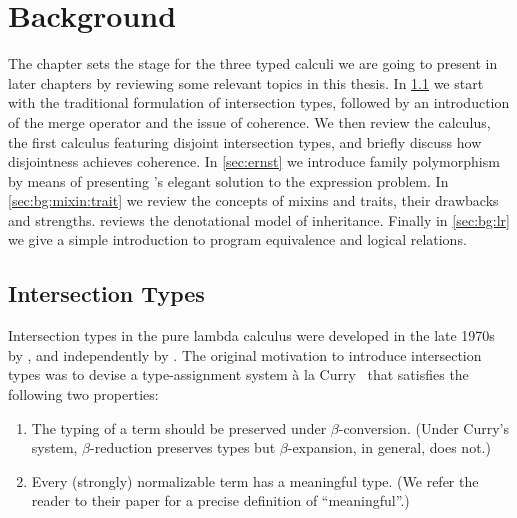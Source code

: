 
\chapter{Background}
\label{chap:background}

The chapter sets the stage for the three typed calculi we are going to
present in later chapters by reviewing some relevant topics in this thesis. In
\cref{bg:sec:intersection} we start with the traditional formulation of
intersection types, followed by an introduction of the merge operator and the
issue of coherence. We then review the \oname calculus, the first calculus
featuring disjoint intersection types, and briefly discuss how disjointness
achieves coherence. In \cref{sec:ernst} we introduce family polymorphism by
means of presenting \citeauthor{ernst2004expression}'s elegant solution to the
expression problem. In \cref{sec:bg:mixin:trait} we review the concepts of
mixins and traits, their drawbacks and strengths.  reviews
the denotational model of inheritance. Finally in \cref{sec:bg:lr} we give a
simple introduction to program equivalence and logical relations.




\section{Intersection Types}
\label{bg:sec:intersection}


Intersection types in the pure lambda calculus were developed in the late
1970s by \citet{coppoInter}, and independently by \citet{pottinger1980type}. The
original motivation to introduce intersection types was to devise a
type-assignment system \`a la Curry~\citep{CurryFeys} that satisfies the
following two properties:
\begin{enumerate}
\item The typing of a term should be preserved under $\beta$-conversion. (Under
  Curry's system, $\beta$-reduction preserves types but $\beta$-expansion, in
  general, does not.)
\item Every (strongly) normalizable term has a meaningful type. (We refer the
  reader to their paper for a precise definition of ``meaningful''.)
\end{enumerate}

